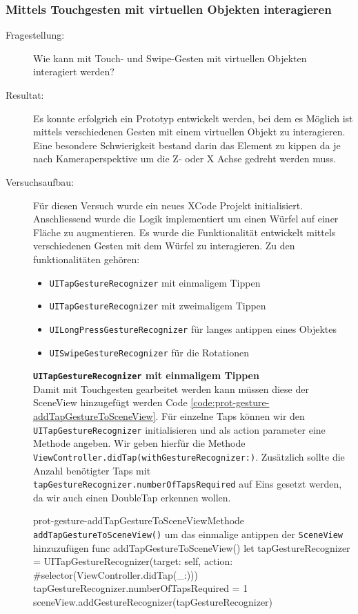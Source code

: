 \subsubsection{Mittels Touchgesten mit virtuellen Objekten interagieren}
\begin{description}
	\item[Fragestellung:] Wie kann mit Touch- und Swipe-Gesten mit virtuellen Objekten interagiert werden?
	\item[Resultat:] Es konnte erfolgrich ein Prototyp entwickelt werden, bei dem es Möglich ist mittels verschiedenen Gesten mit einem virtuellen Objekt zu interagieren. Eine besondere Schwierigkeit bestand darin das Element zu kippen da je nach Kameraperspektive um die Z- oder X Achse gedreht werden muss. 
    \item[Versuchsaufbau:] Für diesen Versuch wurde ein neues XCode Projekt initialisiert. Anschliessend wurde die Logik implementiert um einen Würfel auf einer Fläche zu augmentieren. Es wurde die Funktionalität entwickelt mittels verschiedenen Gesten mit dem Würfel zu interagieren. Zu den funktionalitäten gehören:
    
    
    \begin{itemize}
        \item \texttt{UITapGestureRecognizer} mit einmaligem Tippen
        \item \texttt{UITapGestureRecognizer} mit zweimaligem Tippen
        \item \texttt{UILongPressGestureRecognizer} für langes antippen eines Objektes
        \item \texttt{UISwipeGestureRecognizer} für die Rotationen
    \end{itemize}


    \textbf{\texttt{UITapGestureRecognizer} mit einmaligem Tippen}\label{textbf:tap-gesture-recognizer}\\
    Damit mit Touchgesten gearbeitet werden kann müssen diese der SceneView hinzugefügt werden Code \ref{code:prot-gesture-addTapGestureToSceneView}. Für einzelne Taps können wir den \texttt{UITapGestureRecognizer} initialisieren und als action parameter eine Methode angeben. Wir geben hierfür die Methode \texttt{ViewController.didTap(withGestureRecognizer:)}. Zusätzlich sollte die Anzahl benötigter Taps mit \texttt{tapGestureRecognizer.numberOfTapsRequired} auf Eins gesetzt werden, da wir auch einen DoubleTap erkennen wollen. 
    \begin{code}{prot-gesture-addTapGestureToSceneView}{Methode \texttt{addTapGestureToSceneView()} um das einmalige antippen der \texttt{SceneView} hinzuzufügen}
    func addTapGestureToSceneView() {
        let tapGestureRecognizer = UITapGestureRecognizer(target: self, action: #selector(ViewController.didTap(\_:)))
        tapGestureRecognizer.numberOfTapsRequired = 1
        sceneView.addGestureRecognizer(tapGestureRecognizer)
    }
    \end{code}


\end{description}
